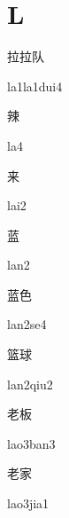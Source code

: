 ﻿%
\section*{L}
\begin{multicols*}{2}

\begin{verbete}[la1la1dui4]{拉拉队}
\begin{pronuncia}{la1la1dui4}
\end{pronuncia}
\end{verbete}

\begin{verbete}[la4]{辣}
\begin{pronuncia}{la4}
\end{pronuncia}
\end{verbete}

\begin{verbete}[lai2]{来}
\begin{pronuncia}{lai2}
\end{pronuncia}
\end{verbete}

\begin{verbete}[lan2]{蓝}
\begin{pronuncia}{lan2}
\end{pronuncia}
\end{verbete}

\begin{verbete}[lan2se4]{蓝色}
\begin{pronuncia}{lan2se4}
\end{pronuncia}
\end{verbete}

\begin{verbete}{篮球}
\begin{pronuncia}{lan2qiu2}
\end{pronuncia}
\end{verbete}

\begin{verbete}{老板}
\begin{pronuncia}{lao3ban3}
\end{pronuncia}
\end{verbete}

\begin{verbete}{老家}
\begin{pronuncia}{lao3jia1}
\end{pronuncia}
\end{verbete}


\end{multicols*}
